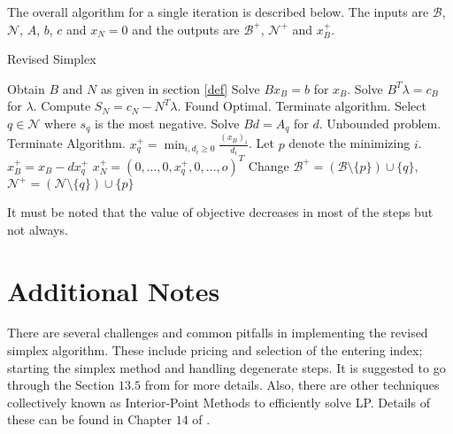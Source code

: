 \documentclass[12pt,letterpaper]{article}
\begin{document}
\nocite{*}

The overall algorithm for a single iteration is described below. The inputs are $\mathcal{B}$, $\mathcal{N}$, $A$, $b$, $c$ and $x_N=0$ and the outputs are $\mathcal{B^+}$, $\mathcal{N^+}$ and $x^+_B$.

\begin{algorithm}[H]
	\caption{Revised Simplex}
	\begin{algorithmic}[1]		
		\State Obtain $B$ and $N$ as given in section \ref{def}
		\State Solve $Bx_B = b$ for $x_B$.
		\State Solve $B^T\lambda = c_B$ for $\lambda$.
		\State Compute $S_N = c_N - N^T\lambda $.		
			\State Found Optimal. Terminate algorithm.
		\Else
			\State Select $q \in \mathcal{N}$ where $s_q$ is the most negative.
			\State Solve $Bd = A_q$ for $d$.
				\State Unbounded problem. Terminate Algorithm.
			\Else
				\State $x^+_q = \min_{i, d_i \ge 0} \frac{(x_B)_i}{d_i}$. Let $p$ denote the minimizing $i$.  
				\State $x^+_B = x_B - dx^+_q$
				\State $x^+_N = (0,\dots,0,x^+_q,0,\dots,o)^T$
				\State Change $\mathcal{B^+} = (\mathcal{B} \setminus \{p\}) \cup \{q\} $, $\mathcal{N^+} = (\mathcal{N} \setminus \{q\}) \cup \{p\} $
			\EndIf
		\EndIf
		\EndFunction
		
	\end{algorithmic}
\end{algorithm}

It must be noted that the value of objective decreases in most of the steps but not always.

\section{Additional Notes}

There are several challenges and common pitfalls in implementing the revised simplex algorithm. These include pricing and selection of the entering index; starting the simplex method and handling degenerate steps. It is suggested to go through the Section $13.5$ from \cite{nocedal2006numerical} for more details. Also, there are other techniques collectively known as Interior-Point Methods to efficiently solve LP. Details of these can be found in Chapter $14$ of \cite{nocedal2006numerical}.

\printbibliography
\end{document}
